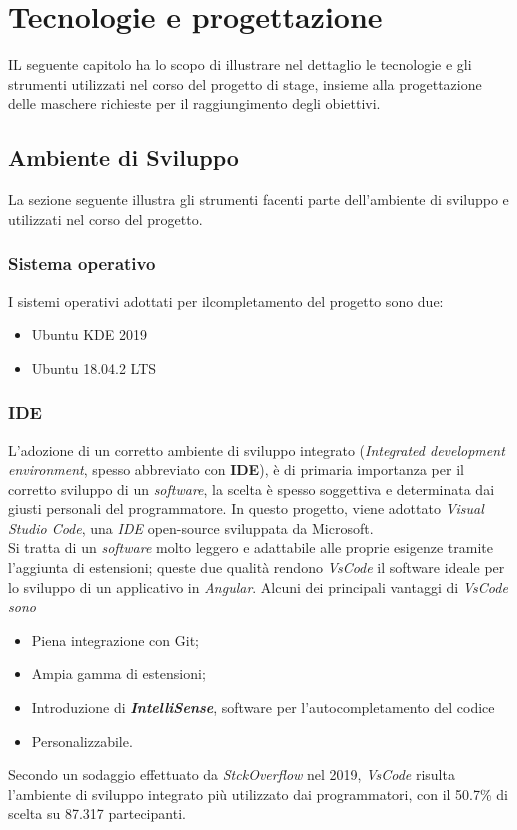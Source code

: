 
\chapter{Tecnologie e progettazione}
\label{cap:tecnologie-progettazione}
IL seguente capitolo ha lo scopo di illustrare nel dettaglio le tecnologie e gli strumenti utilizzati nel corso del progetto di stage, insieme alla progettazione delle maschere richieste per il raggiungimento degli obiettivi. 

\section{Ambiente di Sviluppo}
La sezione seguente illustra gli strumenti facenti parte dell'ambiente di sviluppo e utilizzati nel corso del progetto.

\subsection{Sistema operativo}
I sistemi operativi adottati per ilcompletamento del progetto sono due:
\begin{itemize}
	\item Ubuntu KDE 2019
	\item Ubuntu 18.04.2 LTS
\end{itemize}

\subsection{IDE}
L'adozione di un corretto ambiente di sviluppo integrato (\textit{Integrated development environment}, spesso abbreviato con \textbf{IDE}), è di primaria importanza per il corretto sviluppo di un \textit{software}, la scelta è spesso soggettiva e determinata dai giusti personali del programmatore.
In questo progetto, viene adottato \textit{Visual Studio Code}, una \textit{IDE} \gls{open-source} sviluppata da Microsoft.\\
Si tratta di un \textit{software} molto leggero e adattabile alle proprie esigenze tramite l'aggiunta di estensioni; queste due qualità rendono \textit{VsCode} il software ideale per lo sviluppo di un applicativo in \textit{Angular}.
Alcuni dei principali vantaggi di \textit{VsCode sono}
\begin{itemize}
	\item Piena integrazione con \gls{Git};
	\item Ampia gamma di estensioni;
	\item Introduzione di \textbf{\textit{IntelliSense}}, software per l'autocompletamento del codice
	\item Personalizzabile.
\end{itemize}
Secondo un sodaggio effettuato da \textit{StckOverflow} nel 2019, \textit{VsCode} risulta l'ambiente di sviluppo integrato più utilizzato dai programmatori, con il 50.7\% di scelta su 87.317 partecipanti.


